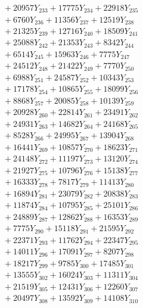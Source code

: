 \documentclass[a4paper,10pt]{article}
\begin{document}
{\begin{align}
&\;  + 20957 Y_{233} + 17775 Y_{234} + 22918 Y_{235} \\[0.3ex]
&\;  + 6760 Y_{236} + 11356 Y_{237} + 12519 Y_{238} \\[0.5ex]\allowbreak
&\;  + 21325 Y_{239} + 12716 Y_{240} + 18509 Y_{241} \\[0.3ex]
&\;  + 25088 Y_{242} + 21353 Y_{243} + 8342 Y_{244} \\[0.3ex]
&\;  + 6514 Y_{245} + 15963 Y_{246} + 7775 Y_{247} \\[0.3ex]
&\;  + 24512 Y_{248} + 21422 Y_{249} + 7770 Y_{250} \\[0.3ex]
&\;  + 6988 Y_{251} + 24587 Y_{252} + 10343 Y_{253} \\[0.3ex]
&\;  + 17178 Y_{254} + 10865 Y_{255} + 18099 Y_{256} \\[0.3ex]
&\;  + 8868 Y_{257} + 20085 Y_{258} + 10139 Y_{259} \\[0.3ex]
&\;  + 20928 Y_{260} + 22814 Y_{261} + 23491 Y_{262} \\[0.3ex]
&\;  + 24931 Y_{263} + 14682 Y_{264} + 24168 Y_{265} \\[0.3ex]
&\;  + 8528 Y_{266} + 24995 Y_{267} + 13904 Y_{268} \\[0.5ex]\allowbreak
&\;  + 16441 Y_{269} + 10857 Y_{270} + 18623 Y_{271} \\[0.3ex]
&\;  + 24148 Y_{272} + 11197 Y_{273} + 13120 Y_{274} \\[0.3ex]
&\;  + 21927 Y_{275} + 10796 Y_{276} + 15138 Y_{277} \\[0.3ex]
&\;  + 16333 Y_{278} + 7817 Y_{279} + 11413 Y_{280} \\[0.3ex]
&\;  + 16894 Y_{281} + 23079 Y_{282} + 20838 Y_{283} \\[0.3ex]
&\;  + 11874 Y_{284} + 10795 Y_{285} + 25101 Y_{286} \\[0.3ex]
&\;  + 24889 Y_{287} + 12862 Y_{288} + 16353 Y_{289} \\[0.3ex]
&\;  + 7775 Y_{290} + 15118 Y_{291} + 21595 Y_{292} \\[0.3ex]
&\;  + 22371 Y_{293} + 11762 Y_{294} + 22347 Y_{295} \\[0.3ex]
&\;  + 14011 Y_{296} + 17091 Y_{297} + 8207 Y_{298} \\[0.5ex]\allowbreak
&\;  + 18217 Y_{299} + 9785 Y_{300} + 17485 Y_{301} \\[0.3ex]
&\;  + 13555 Y_{302} + 16024 Y_{303} + 11311 Y_{304} \\[0.3ex]
&\;  + 21519 Y_{305} + 12431 Y_{306} + 12260 Y_{307} \\[0.3ex]
&\;  + 20497 Y_{308} + 13592 Y_{309} + 14108 Y_{310} \\[0.3ex]

\end{align}}
\end{document}
